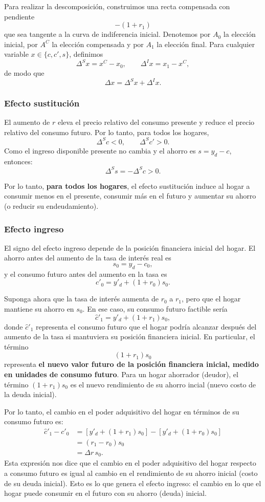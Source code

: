 \documentclass[11pt]{article}
\begin{document}
Para realizar la descomposición, construimos una recta compensada con pendiente
\[
  -(1+r_1)
\]
que sea tangente a la curva de indiferencia inicial. Denotemos por \(A_0\) la elección inicial, por \(A^C\) la elección compensada y por \(A_1\) la elección final. Para cualquier variable \(x\in\{c,c',s\}\), definimos
\[
  \Delta^S x=x^C-x_0,
  \qquad
  \Delta^I x=x_1-x^C,
\]
de modo que
\[
  \Delta x=\Delta^S x+\Delta^I x.
\]

\subsubsection*{Efecto sustitución}

El aumento de \(r\) eleva el precio relativo del consumo presente y reduce el precio relativo del consumo futuro. Por lo tanto, para todos los hogares,
\[
  \Delta^S c<0,
  \qquad
  \Delta^S c'>0.
\]
Como el ingreso disponible presente no cambia y el ahorro es $s=y_d-c$, entonces:
\[
  \Delta^S s=-\Delta^S c>0.
\]

Por lo tanto, \textbf{para todos los hogares}, el efecto sustitución induce al hogar a consumir menos en el presente, consumir más en el futuro y aumentar su ahorro (o reducir su endeudamiento).

\subsubsection*{Efecto ingreso}

El signo del efecto ingreso depende de la posición financiera inicial del hogar. El ahorro antes del aumento de la tasa de interés real es
\[
  s_0=y_d-c_0,
\]
y el consumo futuro antes del aumento en la tasa es
\[
  c'_0=y'_d+(1+r_0)s_0.
\]

Suponga ahora que la tasa de interés aumenta de \(r_0\) a \(r_1\), pero que el hogar mantiene su ahorro en \(s_0\). En ese caso, su consumo futuro factible sería
\[
  \widehat c'_1
  =
  y'_d+(1+r_1)s_0,
\]
donde \(\widehat c'_1\) representa el consumo futuro que el hogar podría alcanzar después del aumento de la tasa si mantuviera su posición financiera inicial. En particular, el término
\[
  (1+r_1)s_0
\]
representa \textbf{el nuevo valor futuro de la posición financiera inicial, medido en unidades de consumo futuro}. Para un hogar ahorrador (deudor), el término $(1+r_1)s_0$ es el nuevo rendimiento de su ahorro incial (nuevo costo de la deuda inicial).

Por lo tanto, el cambio en el poder adquisitivo del hogar en términos de su consumo futuro es:
\begin{align*}
  \widehat c'_1-c'_0
  &=
  \left[y'_d+(1+r_1)s_0\right]
  -
  \left[y'_d+(1+r_0)s_0\right] \\
  &=
  (r_1-r_0)s_0 \\
  &=
  \Delta r\,s_0.
\end{align*}
Esta expresión nos dice que el cambio en el poder adquisitivo del hogar respecto a consumo futuro es igual al cambio en el rendimiento de su ahorro inicial (costo de su deuda inicial). Esto es lo que genera el efecto ingreso: el cambio en lo que el hogar puede consumir en el futuro con su ahorro (deuda) inicial.
\end{document}
